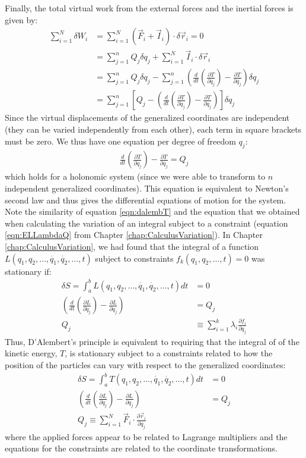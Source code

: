 Finally, the total virtual work from the external forces and the inertial forces is given by:
\begin{align}
\sum_{i=1}^N\delta W_i&= \sum_{i=1}^N (\vec{F}_i+\vec{I}_i)\cdot\delta\vec{r}_i=0\nonumber\\
&=\sum_{j=1}^nQ_j\delta q_j+\sum_{i=1}^N \vec{I}_i\cdot\delta\vec{r}_i\nonumber\\
&=\sum_{j=1}^nQ_j\delta q_j-\sum_{j=1}^n\left(\frac{d}{dt}\left(\frac{\partial T}{\partial \dot{q}_j} \right) - \frac{\partial T}{\partial q_j}\right)\delta q_j \nonumber\\
&=\sum_{j=1}^n \left[ Q_j-\left(\frac{d}{dt}\left(\frac{\partial T}{\partial \dot{q}_j} \right) - \frac{\partial T}{\partial q_j}\right)\right]\delta q_j
\end{align}
Since the virtual displacements of the generalized coordinates are independent (they can be varied independently from each other), each term in square brackets must be zero. We thus have one equation per degree of freedom $q_j$:
\begin{align}
\frac{d}{dt}\left(\frac{\partial T}{\partial \dot{q}_j} \right) - \frac{\partial T}{\partial q_j}=Q_j
\label{eqn:dalembT}
\end{align}
which holds for a holonomic system (since we were able to transform to $n$ independent generalized coordinates). This equation is equivalent to Newton's second law and thus gives the differential equations of motion for the system. Note the similarity of equation \ref{eqn:dalembT} and the equation that we obtained when calculating the variation of an integral subject to a constraint (equation \ref{eqn:ELLambdaQ} from Chapter \ref{chap:CalculusVariation}). In Chapter \ref{chap:CalculusVariation}, we had found that the integral of a function $L(q_1,q_2,\dots,\dot{q_1}, \dot{q_2},\dots,t)$ subject to constraints $f_k(q_1,q_2,\dots ,t)=0$ was stationary if:
\begin{align}
\delta S=\int_a^b L(q_1,q_2,\dots,\dot{q_1}, \dot{q_2},\dots,t)dt&=0\nonumber\\
\left(\frac{d}{dt}\left(\frac{\partial L}{\partial \dot{q}_j}\right)-\frac{\partial L}{\partial q_j}\right) &=Q_j\nonumber\\
Q_j&\equiv \sum_{i=1}^k\lambda_i \frac{\partial f_i}{\partial q_j}
\end{align}
Thus, D'Alembert's principle is equivalent to requiring that the integral of of the kinetic energy, $T$, is stationary subject to a constraints related to how the position of the particles can vary with respect to the generalized coordinates:
\begin{align}
\delta S=\int_a^b T(q_1,q_2,\dots,\dot{q_1}, \dot{q_2},\dots,t)dt&=0\nonumber\\
\left(\frac{d}{dt}\left(\frac{\partial L}{\partial \dot{q}_j}\right)-\frac{\partial L}{\partial q_j}\right) &=Q_j\nonumber\\
 Q_j\equiv \sum_{i=1}^N\vec{F}_i\cdot\frac{\partial\vec{r}_i}{\partial q_j}
\end{align}
where the applied forces appear to be related to Lagrange multipliers and the equations for the constraints are related to the coordinate transformations.

